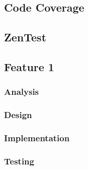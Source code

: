 \documentclass{report}
\begin{document}
\subsection{Code Coverage}
\subsection{ZenTest}
\subsection{Feature 1}
\subsubsection{Analysis}
\subsubsection{Design}
\subsubsection{Implementation}
\subsubsection{Testing}

\appendix
\end{document}
